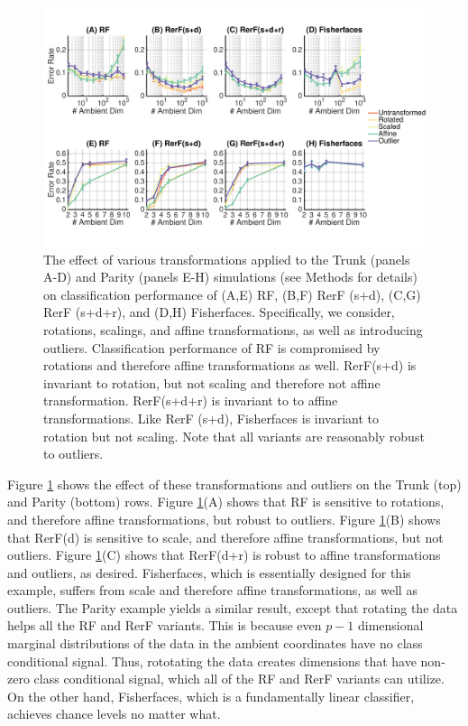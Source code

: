\documentclass{article} %
\begin{document}
\begin{figure}[h]
\begin{center}
\includegraphics[trim=0in 0.9in 0in .09in, clip=true, width=\linewidth]{../Figures/pdf/Fig3_Invariance_v2}
\end{center}
\caption{The effect of various transformations applied to the Trunk (panels A-D) and Parity (panels E-H) simulations (see Methods for details) on classification performance of (A,E) RF, (B,F) RerF (s+d), (C,G) RerF (s+d+r), and (D,H) Fisherfaces. Specifically, we consider, rotations, scalings, and affine transformations, as well as introducing outliers. Classification performance of RF is compromised by rotations and therefore affine transformations as well. RerF(s+d) is invariant to rotation, but not scaling and therefore not affine transformation. RerF(s+d+r) is invariant to to affine transformations. Like RerF (s+d), Fisherfaces is invariant to rotation but not scaling. Note that all variants are reasonably robust to outliers.}
\label{fig:invar}
\end{figure}

Figure \ref{fig:invar} shows the effect of these transformations and outliers on the Trunk (top) and Parity (bottom) rows. Figure \ref{fig:invar}(A) shows that RF is sensitive to rotations, and therefore affine transformations, but robust to outliers.  Figure \ref{fig:invar}(B) shows that RerF(d) is sensitive to scale, and therefore affine transformations, but not outliers.   Figure \ref{fig:invar}(C) shows that RerF(d+r) is robust to affine transformations and outliers, as desired.  Fisherfaces, which is essentially designed for this example, suffers from scale and therefore affine transformations, as well as outliers.  The Parity example yields a similar result, except that rotating the data helps all the RF and RerF variants.  This is because even $p-1$ dimensional marginal distributions of the data in the ambient coordinates have no class conditional signal.  Thus, rototating the data creates dimensions that have non-zero class conditional signal, which all of the RF and RerF variants can utilize.  On the other hand, Fisherfaces, which is a fundamentally linear classifier, achieves chance levels no matter what.   
\end{document}
